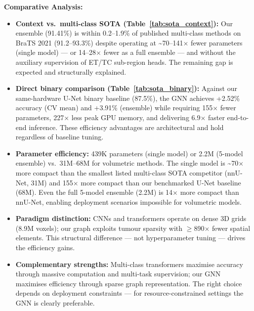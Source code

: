 \textbf{Comparative Analysis:}

\begin{itemize}
    \item \textbf{Context vs.\ multi-class SOTA (Table~\ref{tab:sota_context}):} Our ensemble (91.41\%) is within 0.2--1.9\% of published multi-class methods on BraTS 2021 (91.2--93.3\%) despite operating at \textasciitilde70--141$\times$ fewer parameters (single model) — or 14--28$\times$ fewer as a full ensemble — and without the auxiliary supervision of ET/TC sub-region heads. The remaining gap is expected and structurally explained.

    \item \textbf{Direct binary comparison (Table~\ref{tab:sota_binary}):} Against our same-hardware U-Net binary baseline (87.5\%), the GNN achieves +2.52\% accuracy (CV mean) and +3.91\% (ensemble) while requiring 155$\times$ fewer parameters, 227$\times$ less peak GPU memory, and delivering 6.9$\times$ faster end-to-end inference. These efficiency advantages are architectural and hold regardless of baseline tuning.

    \item \textbf{Parameter efficiency:} 439K parameters (single model) or 2.2M (5-model ensemble) vs.\ 31M--68M for volumetric methods. The single model is \textasciitilde70$\times$ more compact than the smallest listed multi-class SOTA competitor (nnU-Net, 31M) and 155$\times$ more compact than our benchmarked U-Net baseline (68M). Even the full 5-model ensemble (2.2M) is 14$\times$ more compact than nnU-Net, enabling deployment scenarios impossible for volumetric models.

    \item \textbf{Paradigm distinction:} CNNs and transformers operate on dense 3D grids (8.9M voxels); our graph exploits tumour sparsity with $\geq$890$\times$ fewer spatial elements. This structural difference — not hyperparameter tuning — drives the efficiency gains.

    \item \textbf{Complementary strengths:} Multi-class transformers maximise accuracy through massive computation and multi-task supervision; our GNN maximises efficiency through sparse graph representation. The right choice depends on deployment constraints — for resource-constrained settings the GNN is clearly preferable.
\end{itemize}

\vspace{5mm}

